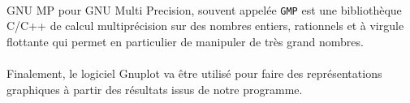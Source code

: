	\paragraph{}{\ttfamily GNU MP} pour {\ttfamily GNU Multi Precision}, souvent appelée \lstinline!GMP! est une bibliothèque {\ttfamily C}/{\ttfamily C++} de calcul multiprécision sur des nombres entiers, rationnels et à virgule flottante qui permet en particulier de manipuler de très grand nombres.
	
	\paragraph{} Finalement, le logiciel {\ttfamily Gnuplot} va être utilisé pour faire des représentations graphiques à partir des résultats issus de notre programme.
	